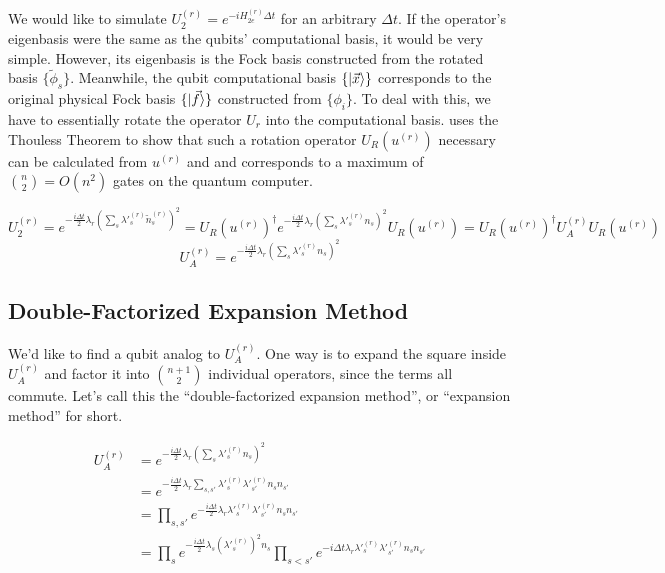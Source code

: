 We would like to simulate $U_2^{(r)} = e^{-iH_{2e}^{(r)}\Delta t}$ for an arbitrary $\Delta t$. If the operator's eigenbasis were the same as the qubits' computational basis, it would be very simple. However, its eigenbasis is the Fock basis constructed from the rotated basis $\{\tilde{\phi}_s\}$. Meanwhile, the qubit computational basis $\{\ket{\vec{x}}\}$ corresponds to the original physical Fock basis $\{\ket{\vec{f}}\}$ constructed from $\{\phi_i\}$. To deal with this, we have to essentially rotate the operator $U_r$ into the computational basis. \cite{FSN} uses the Thouless Theorem to show that such a rotation operator $U_R(u^{(r)})$ necessary can be calculated from $u^{(r)}$ and and corresponds to a maximum of ${n \choose 2} = O(n^2)$ gates on the quantum computer. 

\begin{equation}
    U_2^{(r)} = e^{-\frac{i\Delta t}{2}\lambda_r\left(\sum_s \lambda'^{(r)}_s \tilde{n}^{(r)}_s\right)^2} = U_R(u^{(r)})^\dag e^{-\frac{i\Delta t}{2}\lambda_r\left(\sum_s \lambda'^{(r)}_s n_s\right)^2}U_R(u^{(r)}) = U_R(u^{(r)})^\dag U_A^{(r)}U_R(u^{(r)})
    \label{eq: U_2^r}
\end{equation}
\begin{equation}
    U_A^{(r)} = e^{-\frac{i\Delta t}{2}\lambda_r\left(\sum_s \lambda'^{(r)}_s n_s\right)^2}
\end{equation}

\subsection{Double-Factorized Expansion Method}

We'd like to find a qubit analog to $U_A^{(r)}$. One way is to expand the square inside $U_A^{(r)}$ and factor it into ${n + 1 \choose 2}$ individual operators, since the terms all commute. Let's call this the ``double-factorized expansion method'', or ``expansion method'' for short.

\begin{equation}
    \begin{split}
        U_A^{(r)} &= e^{-\frac{i\Delta t}{2}\lambda_r\left(\sum_s \lambda'^{(r)}_s n_s\right)^2} \\
        &= e^{-\frac{i\Delta t}{2}\lambda_r\sum_{s, s'} \lambda'^{(r)}_s\lambda'^{(r)}_{s'} n_sn_{s'}} \\
        &= \prod_{s, s'} e^{-\frac{i\Delta t}{2}\lambda_r\lambda'^{(r)}_s\lambda'^{(r)}_{s'} n_sn_{s'}} \\
        &= \prod_s e^{-\frac{i\Delta t}{2}\lambda_s(\lambda'^{(r)}_s)^2 n_s}\prod_{s < s'} e^{-i\Delta t\lambda_r\lambda'^{(r)}_s\lambda'^{(r)}_{s'} n_sn_{s'}}
        \label{eq: expansion}
    \end{split}
\end{equation}

